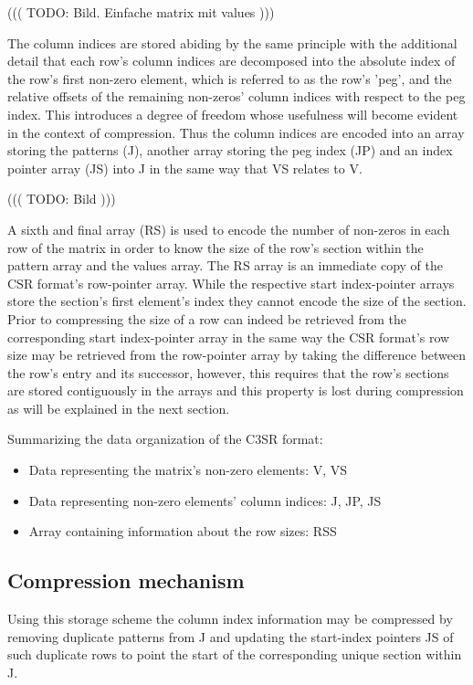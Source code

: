 \documentclass{article}
\begin{document}
      ((( TODO: Bild. Einfache matrix mit values )))

    The column indices are stored abiding by the same principle with the additional detail that each row's column indices are decomposed into the absolute index of the row's first non-zero element, which is referred to as the row's 'peg', and the relative offsets of the remaining non-zeros' column indices with respect to the peg index.  This introduces a degree of freedom whose usefulness will become evident in the context of compression. Thus the column indices are encoded into an array storing the patterns (J), another array storing the peg index (JP) and an index pointer array (JS) into J in the same way that VS relates to V.

      ((( TODO: Bild )))

    A sixth and final array (RS) is used to encode the number of non-zeros in each row of the matrix in order to know the size of the row's section within the pattern array and the values array. The RS array is an immediate copy of the CSR format's row-pointer array.  While the respective start index-pointer arrays store the section's first element's index they cannot encode the size of the section. Prior to compressing the size of a row can indeed be retrieved from the corresponding start index-pointer array in the same way the CSR format's row size may be retrieved from the row-pointer array by taking the difference between the row's entry and its successor, however, this requires that the row's sections are stored contiguously in the arrays and this property is lost during compression as will be explained in the next section.

    Summarizing the data organization of the C3SR format:
    \begin{itemize}
      \item Data representing the matrix's non-zero elements: V, VS
      \item Data representing non-zero elements' column indices: J, JP, JS
      \item Array containing information about the row sizes: RSS
    \end{itemize}

  \subsection{Compression mechanism}

    Using this storage scheme the column index information may be compressed by removing duplicate patterns from J and
    updating the start-index pointers JS of such duplicate rows to point the start of the corresponding unique section
    within J.
\end{document}
